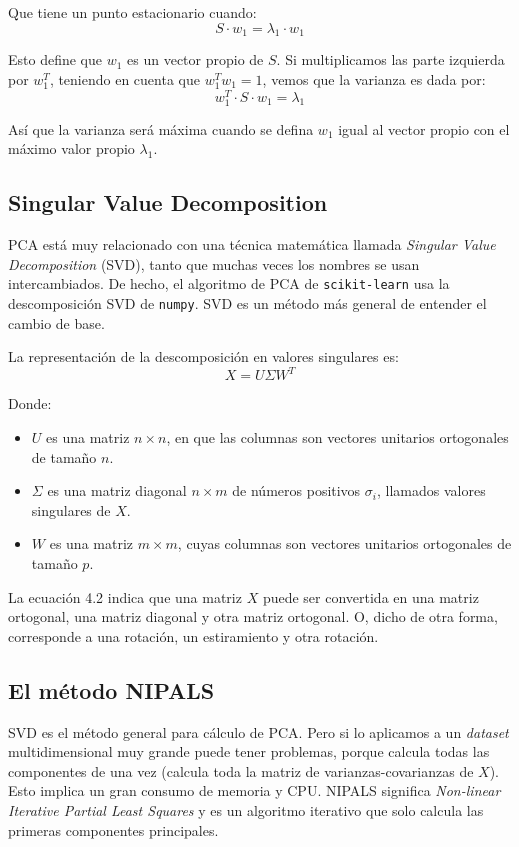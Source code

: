 \documentclass[11pt,spanish,listoffigures,listoftables]{tfgetsinf}
\begin{document}
   Que tiene un punto estacionario cuando:
   \begin{equation}
   S\cdot w_{1} = \lambda_{1} \cdot w_{1}
   \end{equation}
   
   Esto define que \(w_{1}\) es un vector propio de \(S\). Si multiplicamos las parte izquierda por \(w_{1}^{T}\), teniendo en cuenta que \(w_{1}^{T}w_{1}=1\), vemos que la varianza es dada por:
   \begin{equation}
   w_{1}^{T}\cdot S\cdot w_{1} = \lambda_{1} 
   \end{equation}
   
   Así que la varianza será máxima cuando se defina \(w_{1}\) igual al vector propio con el máximo valor propio \(\lambda_{1}\).
   
    \subsection{Singular Value Decomposition}
    PCA está muy relacionado con una técnica matemática llamada {\em Singular Value Decomposition} (SVD), tanto que muchas veces los nombres se usan intercambiados. De hecho, el algoritmo de PCA de {\tt scikit-learn} usa la descomposición SVD de {\tt numpy}. SVD es un método más general de entender el cambio de base.
    
    La representación de la descomposición en valores singulares es:
    \begin{equation}
    X = U \Sigma W^{T}
    \end{equation}
    
    Donde:
    \begin{itemize}
    \item \(U\) es una matriz \(n \times n\), en que las columnas son vectores unitarios ortogonales de tamaño \(n\).
    \item \(\Sigma\) es una matriz diagonal \(n \times m\) de números positivos \(\sigma_{i}\), llamados valores singulares de \(X\).
    \item \(W\) es una matriz \(m \times m\), cuyas columnas son vectores unitarios ortogonales de tamaño \(p\).
    \end{itemize}
    
    La ecuación 4.2 indica que una matriz \(X\) puede ser convertida en una matriz ortogonal, una matriz diagonal y otra matriz ortogonal. O, dicho de otra forma, corresponde a una rotación, un estiramiento y otra rotación.
    
    \subsection{El método NIPALS}
    SVD es el método general para cálculo de PCA. Pero si lo aplicamos a un {\em dataset} multidimensional muy grande puede tener problemas, porque calcula todas las componentes de una vez (calcula toda la matriz de varianzas-covarianzas de \(X\)). Esto implica un gran consumo de memoria y CPU. NIPALS significa {\em Non-linear Iterative Partial Least Squares} y es un algoritmo iterativo que solo calcula las primeras componentes principales.
    
\end{document}
